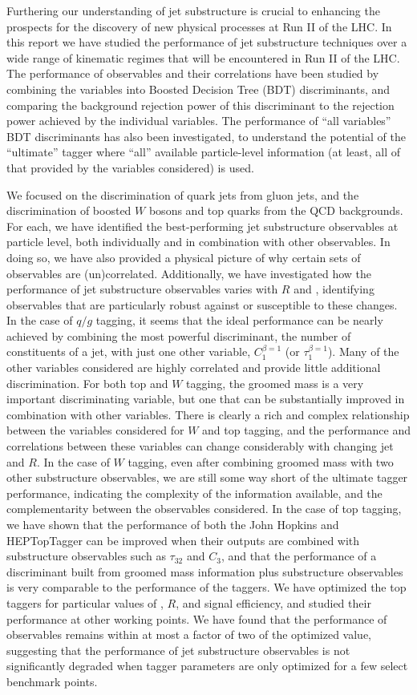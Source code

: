 Furthering our understanding of jet substructure is crucial to enhancing the prospects for the discovery of new physical processes at Run II of the LHC. In this report we have studied the performance of jet substructure techniques over a wide range of kinematic regimes that will be encountered in Run II of the LHC. The performance of observables and their correlations have been studied by combining the variables into Boosted Decision Tree (BDT) discriminants, and comparing the background rejection power of this discriminant to the rejection power achieved by the individual variables. The performance of ``all variables'' BDT discriminants has also been investigated, to understand the potential of the ``ultimate'' tagger where ``all'' available particle-level information (at least, all of that provided by the variables considered) is used.

We focused on the discrimination of quark jets from gluon jets, and the discrimination of boosted $W$ bosons and top quarks from the QCD backgrounds. For each, we have identified the best-performing jet substructure observables at particle level, both individually and in combination with other observables. In doing so, we have also provided a physical picture of why certain sets of observables are (un)correlated. Additionally, we have investigated how the performance of jet substructure observables varies with $R$ and \pt, identifying observables that are particularly robust against or susceptible to these changes. In the case of $q/g$ tagging, it seems that the ideal performance can be nearly achieved by combining the most powerful discriminant, the number of constituents of a jet, with just one other variable, $C_1^{\beta =1}$ (or $\tau_1^{\beta=1}$). Many of the other variables considered are highly correlated and provide little additional discrimination. For both top and $W$ tagging, the groomed mass is a very important discriminating variable, but one that can be substantially improved in combination with other variables. There is clearly a rich and complex relationship between the variables considered for $W$ and top tagging, and the performance and correlations between these variables can change considerably with changing jet \pt and $R$. In the case of $W$ tagging, even after combining groomed mass with two other substructure observables, we are still some way short of the ultimate tagger performance, indicating the complexity of the information available, and the complementarity between the observables considered. In the case of top tagging, we have shown that the performance of both the John Hopkins and HEPTopTagger can be improved when their outputs are combined with substructure observables such as $\tau_{32}$ and $C_{3}$, and that the performance of a discriminant built from groomed mass information plus substructure observables is very comparable to the performance of the taggers.  We have optimized the top taggers for particular values of \pt, $R$, and signal efficiency, and studied their performance at other working points. We have found that the performance of observables remains within at most a factor of two of the optimized value, suggesting that the performance of jet substructure observables is not significantly degraded when tagger parameters are only optimized for a few select benchmark points.

